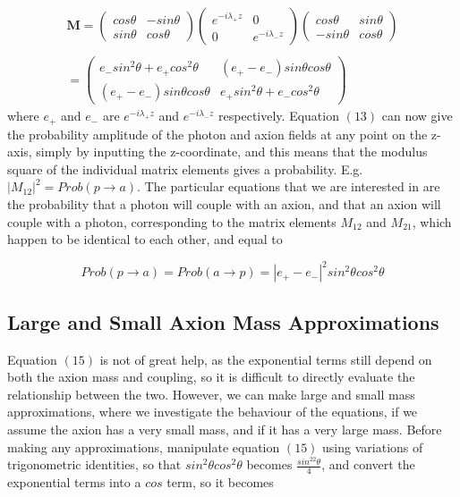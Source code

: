 \documentclass[12pt]{article}
\begin{document}
\begin{equation}
\begin{array}{ccc}
\textbf{M} = \left( \begin{array}{ccc} cos\theta & -sin\theta \\ sin\theta & cos\theta \end{array} \right)
\left( \begin{array}{ccc} e^{-i\lambda_+z} & 0 \\ 0 & e^{-i\lambda_-z} \end{array} \right)
\left( \begin{array}{ccc} cos\theta & sin\theta \\ -sin\theta & cos\theta \end{array} \right) \\
\\
= \left( \begin{array}{ccc} e_-sin^2\theta + e_+cos^2\theta & (e_+-e_-)sin\theta cos\theta \\ 
(e_+-e_-)sin\theta cos\theta & e_+sin^2\theta + e_-cos^2\theta \end{array} \right)
\end{array}
\end{equation}
where $e_+$ and $e_-$ are $e^{-i\lambda_+z}$ and $e^{-i\lambda_-z}$ respectively.
Equation $(13)$ can now give the probability amplitude of the photon and axion fields at any point on the z-axis, simply by inputting the z-coordinate, and this means that the modulus square of the individual matrix elements gives a probability. E.g. ${\left|{M_{12}}\right|}^2 = Prob(p\rightarrow a)$. The particular equations that we are interested in are the probability that a photon will couple with an axion, and that an axion will couple with a photon, corresponding to the matrix elements $M_{12}$ and $M_{21}$, which happen to be identical to each other, and equal to

\begin{equation}
Prob(p\rightarrow a) = Prob(a\rightarrow p) = \left| e_+-e_- \right|^2 sin^2\theta cos^2\theta
\end{equation}

\subsection{Large and Small Axion Mass Approximations}
Equation $(15)$ is not of great help, as the exponential terms still depend on both the axion mass and coupling, so it is difficult to directly evaluate the relationship between the two. However, we can make large and small mass approximations, where we investigate the behaviour of the equations, if we assume the axion has a very small mass, and if it has a very large mass. Before making any approximations, manipulate equation $(15)$ using variations of trigonometric identities, so that $sin^2\theta cos^2\theta$ becomes $\frac{sin^22\theta}{4}$, and convert the exponential terms into a $cos$ term, so it becomes 
\end{document}
